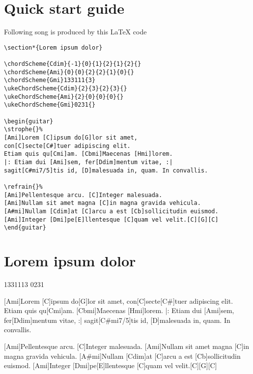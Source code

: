 \documentclass{article}
\makeatletter
\newcommand{\verbatimfont}[1]{\renewcommand{\verbatim@font}{\ttfamily#1}}
\makeatother
\begin{document}
\section*{Quick start guide}
Following song is produced by this \LaTeX{} code

\verbatimfont{\tiny}%
\begin{verbatim}
\section*{Lorem ipsum dolor}

\chordScheme{Cdim}{-1}{0}{1}{2}{1}{2}{}
\chordScheme{Ami}{0}{0}{2}{2}{1}{0}{}
\chordScheme{Gmi}133111{3}
\ukeChordScheme{Cdim}{2}{3}{2}{3}{}
\ukeChordScheme{Ami}{2}{0}{0}{0}{}
\ukeChordScheme{Gmi}0231{}

\begin{guitar}
\strophe{}%
[Ami]Lorem [C]ipsum do[G]lor sit amet,
con[C]secte[C#]tuer adipiscing elit.
Etiam quis qu[Cmi]am. [Cbmi]Maecenas [Hmi]lorem.
|: Etiam dui [Ami]sem, fer[Ddim]mentum vitae, :|
sagit[C#mi7/5]tis id, [D]malesuada in, quam. In convallis.

\refrain{}%
[Ami]Pellentesque arcu. [C]Integer malesuada.
[Ami]Nullam sit amet magna [C]in magna gravida vehicula.
[A#mi]Nullam [Cdim]at [C]arcu a est [Cb]sollicitudin euismod.
[Ami]Integer [Dmi]pe[E]llentesque [C]quam vel velit.[C][G][C]
\end{guitar}
\end{verbatim}

\section*{Lorem ipsum dolor}

133111{3}
0231{}

\begin{guitar}
\strophe{}%
[Ami]Lorem [C]ipsum do[G]lor sit amet,
con[C]secte[C#]tuer adipiscing elit.
Etiam quis qu[Cmi]am. [Cbmi]Maecenas [Hmi]lorem.
|: Etiam dui [Ami]sem, fer[Ddim]mentum vitae, :|
sagit[C#mi7/5]tis id, [D]malesuada in, quam. In convallis.

%
[Ami]Pellentesque arcu. [C]Integer malesuada.
[Ami]Nullam sit amet magna [C]in magna gravida vehicula.
[A#mi]Nullam [Cdim]at [C]arcu a est [Cb]sollicitudin euismod.
[Ami]Integer [Dmi]pe[E]llentesque [C]quam vel velit.[C][G][C]
\end{guitar}
\end{document}
